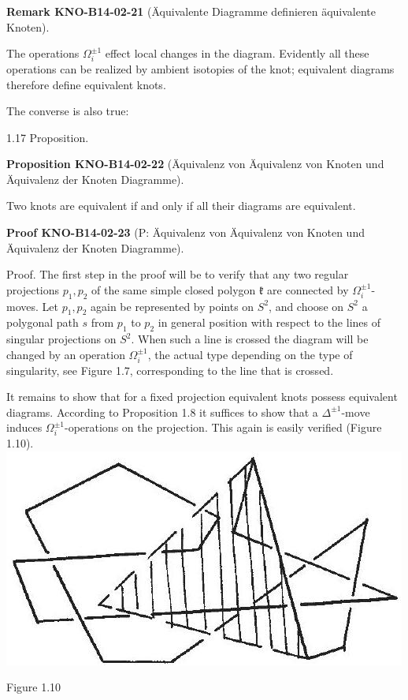 \documentclass[10pt, letterpaper]{article}
\newcommand{\CustomHeading}[3]{%
  \par\medskip\noindent%
  \textbf{#1 #2} \textnormal{(#3)}.\enskip%
}
\newenvironment{PROP}[2]{\begin{unitbox}\CustomHeading{Proposition}{#1}{#2}}{\end{unitbox}}
\newenvironment{REM}[2]{\begin{unitbox}\CustomHeading{Remark}{#1}{#2}}{\end{unitbox}}
\newenvironment{PROOF}[2]{\begin{unitbox}\CustomHeading{Proof}{#1}{#2}}{\end{unitbox}}
\begin{document}
\begin{REM}{KNO-B14-02-21}{Äquivalente Diagramme definieren äquivalente Knoten}
The operations $\Omega_{i}^{ \pm 1}$ effect local changes in the diagram. Evidently all these operations can be realized by ambient isotopies of the knot; equivalent diagrams therefore define equivalent knots.
\end{REM}

The converse is also true:

1.17 Proposition. 

\begin{PROP}{KNO-B14-02-22}{Äquivalenz von Äquivalenz von Knoten und Äquivalenz der Knoten Diagramme}
Two knots are equivalent if and only if all their diagrams are equivalent.
\end{PROP}

\begin{PROOF}{KNO-B14-02-23}{P: Äquivalenz von Äquivalenz von Knoten und Äquivalenz der Knoten Diagramme}
Proof. The first step in the proof will be to verify that any two regular projections $p_{1}, p_{2}$ of the same simple closed polygon $\mathfrak{k}$ are connected by $\Omega_{i}^{ \pm 1}$-moves. Let $p_{1}, p_{2}$ again be represented by points on $S^{2}$, and choose on $S^{2}$ a polygonal path $s$ from $p_{1}$ to $p_{2}$ in general position with respect to the lines of singular projections on $S^{2}$. When such a line is crossed the diagram will be changed by an operation $\Omega_{i}^{ \pm 1}$, the actual type depending on the type of singularity, see Figure 1.7, corresponding to the line that is crossed.

It remains to show that for a fixed projection equivalent knots possess equivalent diagrams. According to Proposition 1.8 it suffices to show that a $\Delta^{ \pm 1}$-move induces $\Omega_{i}^{ \pm 1}$-operations on the projection. This again is easily verified (Figure 1.10).\\
\includegraphics[scale=0.2, center]{2025_05_21_9c06be8de7a55410f8c1g-025}

Figure 1.10\\[0pt]
\end{PROOF}
\end{document}

